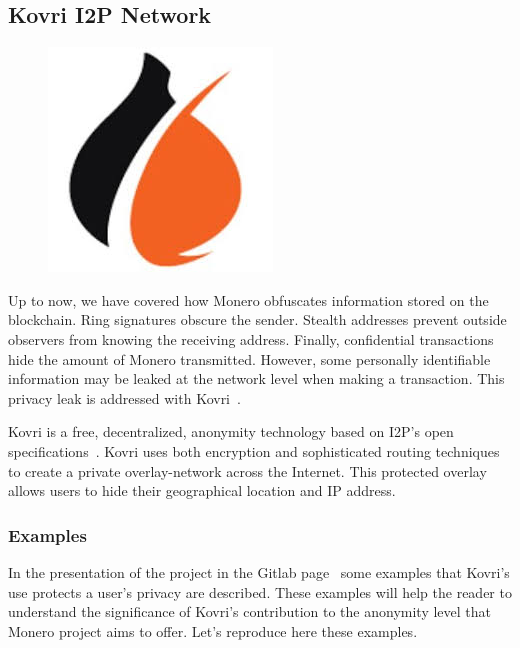 \subsection{Kovri I2P Network} \label{sec:Kovri}
\begin{figure}
\centering
\includegraphics[height=0.28\textwidth]{Images/Kovri/kovri.jpg}
\end{figure}
Up to now, we have covered how Monero obfuscates information stored on the blockchain. Ring signatures obscure the sender. Stealth addresses prevent outside observers from knowing the receiving address. Finally, confidential transactions hide the amount of Monero transmitted. However, some personally identifiable information may be leaked at the network level when making a transaction. This privacy leak is addressed with Kovri~\cite{kovri}.

Kovri is a free, decentralized, anonymity technology based on I2P's open specifications~\cite{i2p}. Kovri uses both encryption and sophisticated routing techniques to create a private overlay-network across the Internet. This protected overlay allows users to hide their geographical location and IP address.

\subsubsection{Examples}
In the presentation of the project in the Gitlab page~\cite{git_kovri} some examples that Kovri's use protects a user's privacy are described. These examples will help the reader to understand the significance of Kovri's contribution to the anonymity level that Monero project aims to offer. Let's reproduce here these examples.

